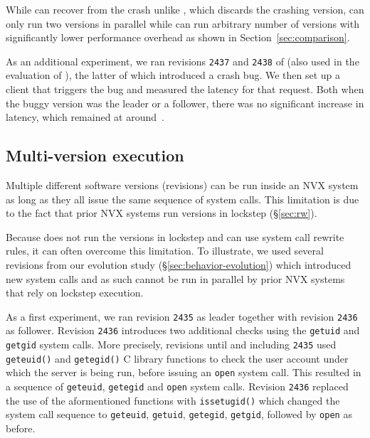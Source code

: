 While \mx can recover from the crash unlike \varan, which discards the crashing
version, \mx can only run two versions in parallel while \varan can run
arbitrary number of versions with significantly lower performance overhead as
shown in Section~\ref{sec:comparison}.

As an additional experiment, we ran revisions \lstinline`2437` and
\lstinline`2438` of \lighttpd (also used in the evaluation of \mx),
the latter of which introduced a crash bug.  We then set up a client
that triggers the bug and measured the latency for that request. Both when the
buggy version was the leader or a follower, there was no significant increase
in latency, which remained at around~\lighttpdnormallatency.

\subsection{Multi-version execution}
\label{sec:mv-execution}

Multiple different software versions (revisions) can be run inside an NVX
system as long as they all issue the same sequence of system calls. This
limitation is due to the fact that prior NVX systems run versions in lockstep
(\S\ref{sec:rw}).

Because \varan does not run the versions in lockstep and can use system call
rewrite rules, it can often overcome this limitation. To illustrate, we used
several \lighttpd revisions from our evolution study
(\S\ref{sec:behavior-evolution}) which introduced new system calls and as such
cannot be run in parallel by prior NVX systems that rely on lockstep execution.

As a first experiment, we ran revision \lstinline`2435` as
leader together with revision \lstinline`2436` as follower.  Revision
\lstinline`2436` introduces two additional checks using the
\lstinline`getuid` and \lstinline`getgid` system calls.  More
precisely, revisions until and including \lstinline`2435` used
\lstinline`geteuid()` and \lstinline`getegid()` C library functions to
check the user account under which the server is being run, before
issuing an \lstinline`open` system call.  This resulted in a sequence
of \lstinline`geteuid`, \lstinline`getegid` and \lstinline`open`
system calls.  Revision \lstinline`2436` replaced the use of the
aformentioned functions with \lstinline`issetugid()` which changed the
system call sequence to \lstinline`geteuid`, \lstinline`getuid`,
\lstinline`getegid`, \lstinline`getgid`, followed by \lstinline`open`
as before.

